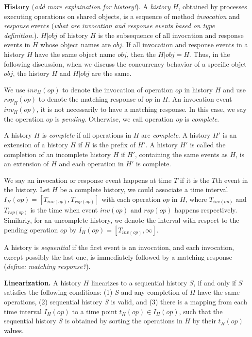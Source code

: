 \textbf{History}
(\emph{add more explaination for history!}).
A \emph{history} $H$, obtained by processes executing
operations on shared objects, is a sequence of method \emph{invocation} and \emph{response} events
(\emph{what are invocation and response events based on type definition.}). $H|obj$ of history $H$ is the subsequence of all
invocation and response events in $H$ whose object names are $obj$. If all invocation and response
events in a history $H$ have the same object name $obj$, then the $H|obj = H$. Thus, in the following discussion,
when we discuss the concurrency behavior of a specific objet $obj$, the history $H$ and $H|obj$ are the same.

We use $inv_H(op)$ to denote the invocation of operation $op$ in history $H$ and use $rsp_H(op)$ to
denote the matching response of $op$ in $H$. An invocation event $inv_H(op)$, it is not necessarily to have a
matching response. In this case, we say the operation $op$ is \emph{pending}. Otherwise, we call operation \emph{op}
is \emph{complete}.

A history $H$ is \emph{complete} if all operations in $H$ are \emph{complete}. A history $H'$ is an extension of a history $H$
if $H$ is the prefix of $H'$. A history $H'$ is called the completion of an incomplete history $H$ if $H'$, containing the same
events as $H$, is an extension of $H$ and each operation in $H'$ is complete.

We say an invocation or response event happens at time $T$ if it is the $T$th event in the history.
Let $H$ be a complete history, we could associate a time interval $I_H(op) = [T_{inv(op)}, T_{rsp(op)}]$ with each
operation $op$ in $H$, where $T_{inv(op)}$ and $T_{rsp(op)}$ is the time when event $inv(op)$ and $rsp(op)$ happens
respectively. Similarly, for an uncomplete history, we denote the interval with respect to the pending
operation $op$ by $I_H(op) = [T_{inv(op)}, \infty]$.

A history is \emph{sequential} if the first event is an invocation, and each invocation, except possibly the last
one, is immediately followed by a matching response (\emph{define: matching response?}).



\textbf{Linearization.}
A history $H$ linearizes to a sequential history $S$, if and only if $S$ satisfies the
following conditions: (1) $S$ and any completion of $H$ have the same operations, (2) sequential history $S$ is
valid, and (3) there is a mapping from each time interval $I_H(op)$ to a time point $t_H(op) \in I_H(op)$, such
that the sequential history $S$ is obtained by sorting the operations in $H$ by their $t_H(op)$ values.

